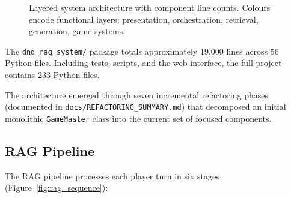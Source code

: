 \documentclass[12pt,a4paper]{article}
\begin{document}
\begin{figure}[H]
\caption{Layered system architecture with component line counts.
Colours encode functional layers: \textcolor{layerUI}{presentation},
\textcolor{layerOrch}{orchestration},
\textcolor{layerRAG}{retrieval},
\textcolor{layerLLM}{generation},
\textcolor{layerState}{game systems}.}
\label{fig:architecture}
\end{figure}

The \texttt{dnd\_rag\_system/} package totals approximately 19,000 lines
across 56 Python files. Including tests, scripts, and the web interface, the
full project contains 233 Python files.

The architecture emerged through seven incremental refactoring phases
(documented in \texttt{docs/REFACTORING\_SUMMARY.md}) that decomposed an
initial monolithic \texttt{GameMaster} class into the current set of
focused components.

\subsection{RAG Pipeline}
\label{sec:ragpipeline}

The RAG pipeline processes each player turn in six stages
(Figure~\ref{fig:rag_sequence}):
\end{document}
